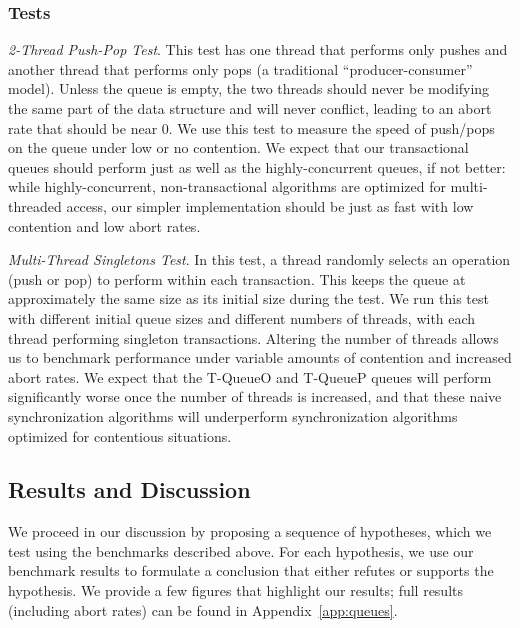\subsubsection{Tests}
    \emph{2-Thread Push-Pop Test}. This test has one thread that performs only pushes and another thread that performs only pops (a traditional ``producer-consumer'' model). Unless the queue is empty, the two threads should never be modifying the same part of the data structure and will never conflict, leading to an abort rate that should be near 0. We use this test to measure the speed of push/pops on the queue under low or no contention. We expect that our transactional queues should perform just as well as the highly-concurrent queues, if not better: while highly-concurrent, non-transactional algorithms are optimized for multi-threaded access, our simpler implementation should be just as fast with low contention and low abort rates.

\emph{Multi-Thread Singletons Test}.
    In this test, a thread randomly selects an operation (push or pop) to perform within each transaction. This keeps the queue at approximately the same size as its initial size during the test. We run this test with different initial queue sizes and different numbers of threads, with each thread performing singleton transactions. Altering the number of threads allows us to benchmark performance under variable amounts of contention and increased abort rates. We expect that the T-QueueO and T-QueueP queues will perform significantly worse once the number of threads is increased, and that these naive synchronization algorithms will underperform synchronization algorithms optimized for contentious situations.

\subsection{Results and Discussion}

We proceed in our discussion by proposing a sequence of hypotheses, which we test using the benchmarks described above. For each hypothesis, we use our benchmark results to formulate a conclusion that either refutes or supports the hypothesis.
We provide a few figures that highlight our results; full results (including abort rates) can be found in Appendix~\ref{app:queues}. 

